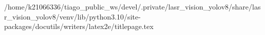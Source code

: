 /home/k21066336/tiago_public_ws/devel/.private/lasr_vision_yolov8/share/lasr_vision_yolov8/venv/lib/python3.10/site-packages/docutils/writers/latex2e/titlepage.tex